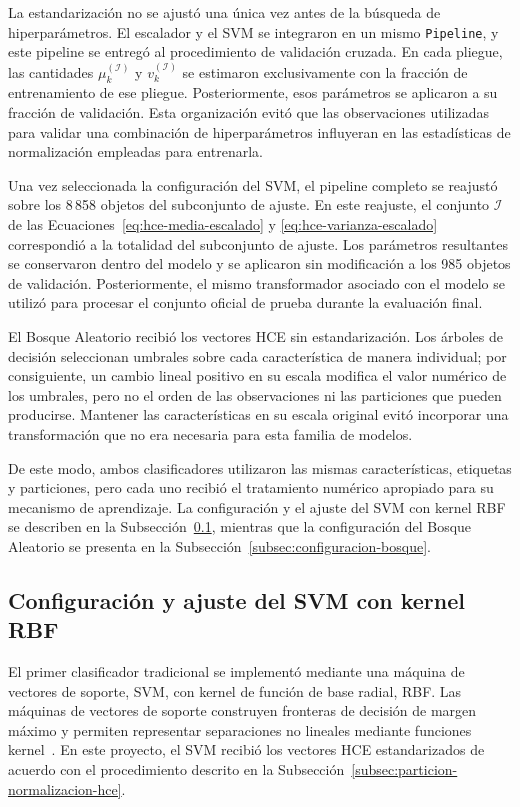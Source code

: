 La estandarización no se ajustó una única vez antes de la búsqueda de hiperparámetros. El escalador y el SVM se integraron en un mismo \texttt{Pipeline}, y este pipeline se entregó al procedimiento de validación cruzada. En cada pliegue, las cantidades $\mu_k^{(\mathcal I)}$ y $v_k^{(\mathcal I)}$ se estimaron exclusivamente con la fracción de entrenamiento de ese pliegue. Posteriormente, esos parámetros se aplicaron a su fracción de validación. Esta organización evitó que las observaciones utilizadas para validar una combinación de hiperparámetros influyeran en las estadísticas de normalización empleadas para entrenarla.

Una vez seleccionada la configuración del SVM, el pipeline completo se reajustó sobre los 8\,858 objetos del subconjunto de ajuste. En este reajuste, el conjunto $\mathcal I$ de las Ecuaciones~\eqref{eq:hce-media-escalado} y \eqref{eq:hce-varianza-escalado} correspondió a la totalidad del subconjunto de ajuste. Los parámetros resultantes se conservaron dentro del modelo y se aplicaron sin modificación a los 985 objetos de validación. Posteriormente, el mismo transformador asociado con el modelo se utilizó para procesar el conjunto oficial de prueba durante la evaluación final.

El Bosque Aleatorio recibió los vectores HCE sin estandarización. Los árboles de decisión seleccionan umbrales sobre cada característica de manera individual; por consiguiente, un cambio lineal positivo en su escala modifica el valor numérico de los umbrales, pero no el orden de las observaciones ni las particiones que pueden producirse. Mantener las características en su escala original evitó incorporar una transformación que no era necesaria para esta familia de modelos.

De este modo, ambos clasificadores utilizaron las mismas características, etiquetas y particiones, pero cada uno recibió el tratamiento numérico apropiado para su mecanismo de aprendizaje. La configuración y el ajuste del SVM con kernel RBF se describen en la Subsección~\ref{subsec:configuracion-svm}, mientras que la configuración del Bosque Aleatorio se presenta en la Subsección~\ref{subsec:configuracion-bosque}.

\subsection{Configuración y ajuste del SVM con kernel RBF}
\label{subsec:configuracion-svm}

El primer clasificador tradicional se implementó mediante una máquina de vectores de soporte, SVM, con kernel de función de base radial, RBF. Las máquinas de vectores de soporte construyen fronteras de decisión de margen máximo y permiten representar separaciones no lineales mediante funciones kernel~\parencite{cortes1995}. En este proyecto, el SVM recibió los vectores HCE estandarizados de acuerdo con el procedimiento descrito en la Subsección~\ref{subsec:particion-normalizacion-hce}.

